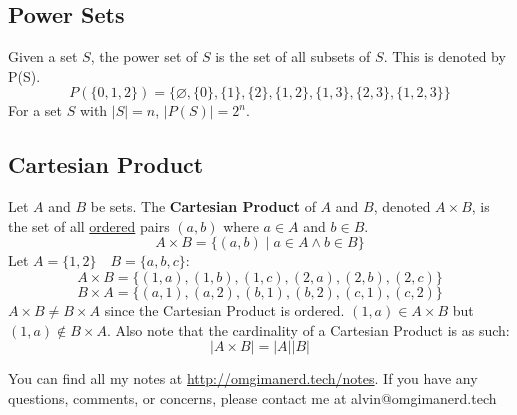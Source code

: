 \documentclass[letterpaper, 12pt]{math}
\begin{document}
\subsection*{Power Sets}
Given a set \( S \), the power set of \( S \) is the set of all subsets of
\( S \). This is denoted by P(S).
\[ P(\{0,1,2\}) = \{ \varnothing, \{0\}, \{1\}, \{2\}, \{1,2\}, \{1,3\}, \{2,3\},
   \{1,2,3\}\} \]
For a set \( S \) with \( |S| = n \), \( |P(S)| = 2^{n} \).

\subsection*{Cartesian Product}
Let \( A \) and \( B \) be sets. The \textbf{Cartesian Product} of \( A \) and
\( B \), denoted \( A \times B \), is the set of all \underline{ordered} pairs
\( (a, b) \) where \( a \in A \) and \( b \in B \).
\[ A \times B = \{(a,b)\mid a \in A \wedge b \in B\} \]
Let \( A = \{1,2\} \quad B = \{a,b,c\} \):
\[ A \times B = \{(1,a),(1,b),(1,c),(2,a),(2,b),(2,c)\} \]
\[ B \times A = \{(a,1),(a,2),(b,1),(b,2),(c,1),(c,2)\} \]
\( A \times B \neq B \times A \) since the Cartesian Product is ordered.
\( (1,a) \in A \times B \) but \( (1,a) \notin B \times A \).
Also note that the cardinality of a Cartesian Product is as such:
\[ |A \times B| = |A||B| \]

\begin{center}
  You can find all my notes at \url{http://omgimanerd.tech/notes}. If you have
  any questions, comments, or concerns, please contact me at
  alvin@omgimanerd.tech
\end{center}
\end{document}
